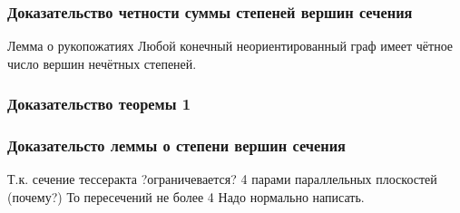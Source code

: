 \documentclass[10pt,pdf,hyperref={unicode}]{beamer}
\begin{document}
\begin{frame}
	\frametitle{Доказательство четности суммы степеней вершин сечения}
	\begin{block}{Лемма о рукопожатиях}
		Любой конечный неориентированный граф имеет чётное число вершин нечётных степеней.
	\end{block}
\end{frame}
\begin{frame}
	\frametitle{Доказательство теоремы 1}
\end{frame}
\begin{frame}
	\frametitle{Доказательсто леммы о степени вершин сечения}
	Т.к. сечение тессеракта ?ограничевается? 4 парами параллельных плоскостей (почему?)
	То пересечений не более 4
	Надо нормально написать.
	\begin{block}{}
	\end{block}
\end{frame}
\end{document}
